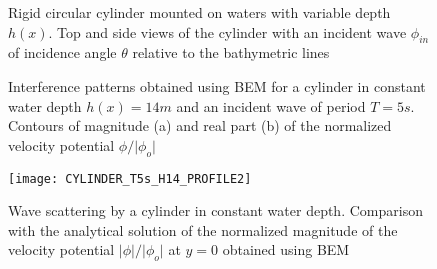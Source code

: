 \begin{figure}
\centering
\def\svgwidth{0.8\columnwidth}

\caption{Rigid circular cylinder mounted on waters with variable depth $h(x)$. Top and side views of the cylinder with an incident wave $\phi_{in}$ of incidence angle $\theta$ relative to the bathymetric lines}
\label{fig:CYLINDER_SCHEME}
\end{figure}


\begin{figure}
\begin{center}
\vspace{0.05cm}
\caption{Interference patterns obtained using BEM for a cylinder in constant water depth $h(x)=14 m$ and an incident wave of period $T=5s$. Contours of magnitude (a) and real part (b) of the normalized velocity potential $\phi / \vert\phi_{o}\vert$}
\label{fig:Cylinder Constant Bathymetry}
\end{center}
\end{figure}



\begin{figure}
\begin{center}
\texttt{[image: CYLINDER\_T5s\_H14\_PROFILE2]}
\caption{Wave scattering by a cylinder in constant water depth. Comparison with the analytical solution of the normalized magnitude of the velocity potential $\vert\phi\vert / \vert\phi_{o}\vert$ at $y=0$ obtained using BEM}
\label{fig:Cylinder Constant Bathymetry PROFILE}
\end{center}
\end{figure}

